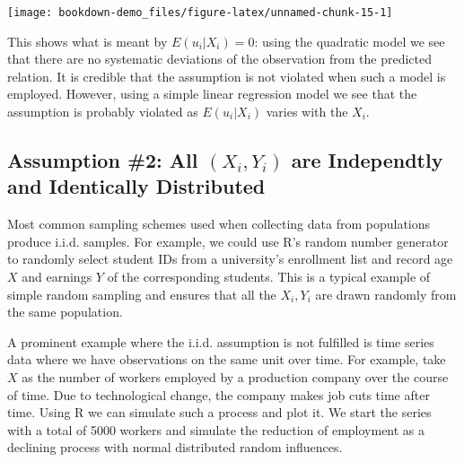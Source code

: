 \documentclass[]{book}
\theoremstyle{definition}
\theoremstyle{definition}
\theoremstyle{definition}
\theoremstyle{remark}
\begin{document}
\begin{center}\texttt{[image: bookdown-demo\_files/figure-latex/unnamed-chunk-15-1]} \end{center}

This shows what is meant by \(E(u_i|X_i) = 0\): using the quadratic
model we see that there are no systematic deviations of the observation
from the predicted relation. It is credible that the assumption is not
violated when such a model is employed. However, using a simple linear
regression model we see that the assumption is probably violated as
\(E(u_i|X_i)\) varies with the \(X_i\).

\subsection{\texorpdfstring{Assumption \#2: All \((X_i, Y_i)\) are
Independtly and Identically
Distributed}{Assumption \#2: All (X\_i, Y\_i) are Independtly and Identically Distributed}}\label{assumption-2-all-x_i-y_i-are-independtly-and-identically-distributed}

Most common sampling schemes used when collecting data from populations
produce i.i.d. samples. For example, we could use R's random number
generator to randomly select student IDs from a university's enrollment
list and record age \(X\) and earnings \(Y\) of the corresponding
students. This is a typical example of simple random sampling and
ensures that all the \(X_i,Y_i\) are drawn randomly from the same
population.

A prominent example where the i.i.d. assumption is not fulfilled is time
series data where we have observations on the same unit over time. For
example, take \(X\) as the number of workers employed by a production
company over the course of time. Due to technological change, the
company makes job cuts time after time. Using R we can simulate such a
process and plot it. We start the series with a total of 5000 workers
and simulate the reduction of employment as a declining process with
normal distributed random influences.
\end{document}
